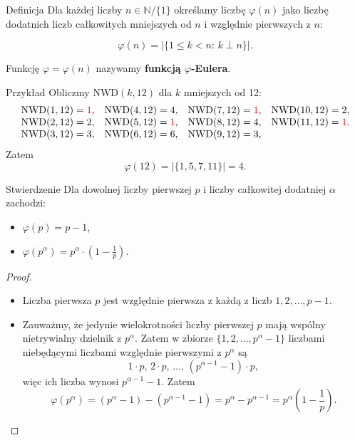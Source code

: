 \documentclass[a4paper,10pt]{beamer}
\begin{document}
\begin{frame}
	
	\begin{block}{Definicja}
		Dla każdej liczby $n\in\mathbb{N}/\{1\}$ określamy liczbę $\varphi(n)$ jako liczbę dodatnich liczb całkowitych mniejszych od $n$ i względnie pierwszych z $n$:
		
		$$\varphi(n)=\Big|\{1\leqslant k<n:\,k\perp n \}\Big|.$$
		
		 Funkcję $\varphi=\varphi(n)$ nazywamy {\bf funkcją $\varphi$-Eulera}.
	\end{block}
	
	
	\begin{exampleblock}{Przykład}
		Obliczmy $\mbox{NWD}(k,12)$ dla $k$ mniejszych od 12:
			$$\begin{array}{llll}
			\mbox{NWD}(1,12)=\textcolor{red}{1}, &\mbox{NWD}(4,12)=4, &\mbox{NWD}(7,12)=\textcolor{red}{1},&\mbox{NWD}(10,12)=2, \\
			\mbox{NWD}(2,12)=2, &\mbox{NWD}(5,12)=\textcolor{red}{1}, &\mbox{NWD}(8,12)=4,&\mbox{NWD}(11,12)=\textcolor{red}{1}. \\
			\mbox{NWD}(3,12)=3, &\mbox{NWD}(6,12)=6, &\mbox{NWD}(9,12)=3,
			\end{array}$$
		Zatem
		$$\varphi(12)=\Big|\{1,5,7,11\}\Big|=4.$$

	\end{exampleblock}	
	
	
	
\end{frame}	
	
	
\begin{frame}


\begin{block}{Stwierdzenie}
 Dla dowolnej liczby pierwszej $p$ i liczby całkowitej dodatniej $\alpha$ zachodzi:
 \begin{itemize}
 \item $\varphi(p)=p-1$,\\
 \item $\varphi(p^{\alpha})=p^{\alpha}\cdot\left(1-\frac1p\right).$
 \end{itemize}
\end{block}

\begin{proof}
	\begin{itemize}
		\item Liczba pierwsza $p$ jest  względnie pierwsza z każdą z liczb $1,2,\ldots,p-1$.
		\item Zauważmy, że jedynie wielokrotności liczby pierwszej $p$ mają wspólny nietrywialny dzielnik z $p^\alpha$. Zatem w zbiorze $\{1,2,\ldots,p^\alpha-1\}$ liczbami niebędącymi liczbami względnie pierwszymi z $p^\alpha$ są
		$$1\cdot p,\,2\cdot p,\,\ldots,\,(p^{\alpha-1}-1)\cdot p,$$
		więc ich liczba wynosi $p^{\alpha-1}-1$.
		Zatem
		$$\varphi\left(p^{\alpha}\right)=\left(p^{\alpha}-1\right)-\left(p^{\alpha-1}-1\right)=p^{\alpha}-p^{\alpha-1}=p^{\alpha}\left(1-\frac1p\right).$$
	\end{itemize}
\end{proof}


\end{frame}
\end{document}
